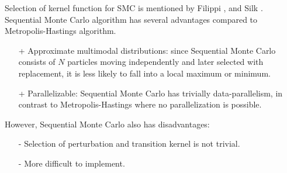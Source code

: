 \noindent Selection of kernel function for SMC is mentioned by Filippi \cite{filippi2013optimality},
and Silk \cite{silk2012optimizing}. Sequential Monte Carlo algorithm has several advantages compared
to Metropolis-Hastings algorithm.
\begin{itemize}
    \item[+] Approximate multimodal distributions: since Sequential Monte Carlo consists of $N$
          particles moving independently and later selected with replacement, it is less likely to
          fall into a local maximum or minimum.
    \item[+] Parallelizable: Sequential Monte Carlo has trivially data-parallelism, in contrast to
          Metropolis-Hastings where no parallelization is possible.
\end{itemize}
However, Sequential Monte Carlo also has disadvantages:
\begin{itemize}
    \item[-] Selection of perturbation and transition kernel is not trivial.
    \item[-] More difficult to implement.
\end{itemize}


